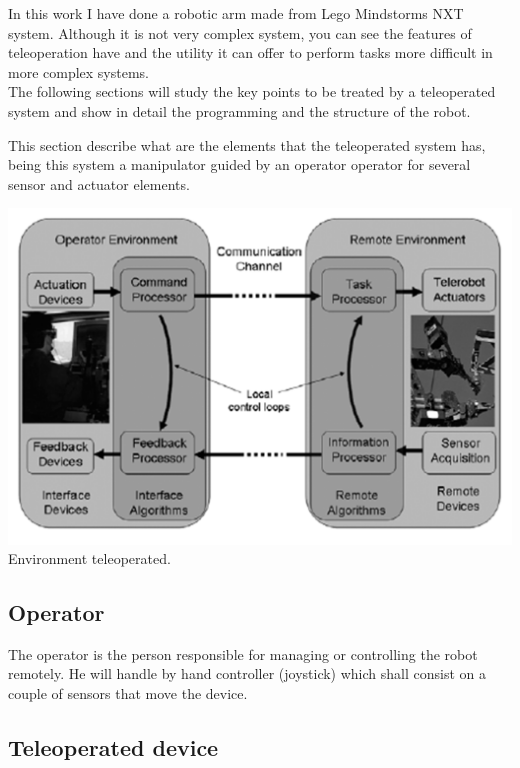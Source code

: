 \documentclass[a4paper,11pt]{article}
\begin{document}
\begin{multicols}{2}
			In this work I have done a robotic arm made from Lego Mindstorms NXT system. Although it is not very complex system, you can see the features of teleoperation have and the utility it can offer to perform tasks more difficult in more complex systems.\\

			The following sections will study the key points to be treated by a teleoperated system and show in detail the programming and the structure of the robot.
		
		
			This section describe what are the elements that the teleoperated system has, being this system a manipulator guided by an operator operator for several sensor and actuator elements.
			
			\begin{center}
				\includegraphics[scale=0.2]{img/environment.png}
				Environment teleoperated.
			\end{center}

			\subsection{Operator}

				The operator is the person responsible for managing or controlling the robot remotely. He will handle by hand controller (joystick) which shall consist on a couple of sensors that move the device.

			\subsection{Teleoperated device}


\end{multicols}
\end{document}
